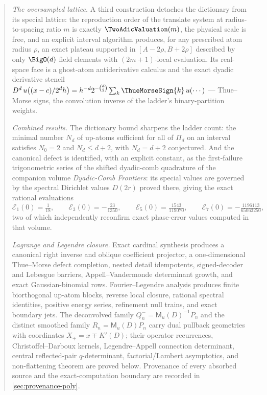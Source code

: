 \documentclass[11pt,oneside]{article}
\numberwithin{equation}{section}
\theoremstyle{definition}
\theoremstyle{remark}
\newcommand{\MM}{\mathsf M}
\newcommand{\PiD}{\Pi_d}
\begin{document}
\begin{abstract}
\emph{The oversampled lattice.}  A third construction detaches the
dictionary from its special lattice: the reproduction order of the
translate system at radius-to-spacing ratio $m$ is exactly
$\TwoAdicValuation(m)$, the physical scale is free, and an explicit interval
algorithm produces, for any prescribed atom radius $\rho$, an exact
plateau supported in $[A-2\rho,B+2\rho]$ described by only
$\BigO(d)$ field elements with $(2m+1)$-local evaluation.  Its
real-space face is a ghost-atom antiderivative calculus and the exact
dyadic derivative stencil
$D^{d}\,u\bigl((x-c)/2^{d}h\bigr)
=h^{-d}2^{-\binom d2}\sum_k\ThueMorseSign{k}\,u(\cdots)$ --- Thue--Morse signs,
the convolution inverse of the ladder's binary-partition weights.

\emph{Combined results.}  The dictionary bound sharpens the ladder
count: the minimal number $N_d$ of up-atoms sufficient for all of
$\PiD$ on an interval satisfies $N_0=2$ and $N_d\le d+2$, with
$N_d=d+2$ conjectured.  And the canonical defect is identified, with
an explicit constant, as the first-failure trigonometric series of
the shifted dyadic-comb quadrature of the companion volume
\emph{Dyadic-Comb Frontiers}: its special values are governed by the
spectral Dirichlet values $D(2r)$ proved there, giving the exact
rational evaluations
\[
 \mathcal E_1(0)=\tfrac1{18},\qquad
 \mathcal E_3(0)=-\tfrac{23}{1350},\qquad
 \mathcal E_5(0)=\tfrac{1543}{119070},\qquad
 \mathcal E_7(0)=-\tfrac{1196113}{65063250},
\]
two of which independently reconfirm exact phase-error values computed
in that volume.

\emph{Lagrange and Legendre closure.}  Exact cardinal synthesis produces a
canonical right inverse and oblique coefficient projector, a one-dimensional
Thue--Morse defect completion, nested detail idempotents, signed-decoder and
Lebesgue barriers, Appell--Vandermonde determinant growth, and exact
Gaussian-binomial rows.  Fourier--Legendre analysis produces finite
biorthogonal up-atom blocks, reverse local closure, rational spectral
identities, positive energy series, refinement null trains, and exact boundary
jets.  The deconvolved family $Q_n^-=\MM_u(D)^{-1}P_n$ and the distinct
smoothed family $R_n=\MM_u(D)P_n$ carry dual pullback geometries with
coordinates $X_\mp=x\mp K'(D)$; their operator recurrences,
Christoffel--Darboux kernels, Legendre--Appell connection determinant,
central reflected-pair $q$-determinant, factorial/Lambert asymptotics, and
non-flattening theorem are proved below.  Provenance of every absorbed source
and the exact-computation boundary are recorded in
\cref{sec:provenance-poly}.
\end{abstract}
\end{document}
